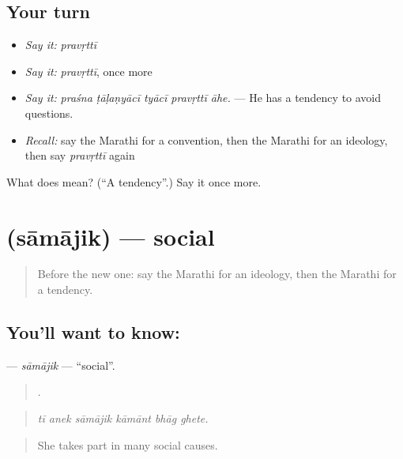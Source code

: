 \subsection*{Your turn}
\begin{itemize}
\raggedright
  \item \emph{Say it:} \emph{pravṛttī}
  \item \emph{Say it:} \emph{pravṛttī}, once more
  \item \emph{Say it:} \emph{praśna ṭāḷaṇyācī tyācī pravṛttī āhe.} — He has a tendency to avoid questions.
  \item \emph{Recall:} say the Marathi for a convention, then the Marathi for an ideology, then say \emph{pravṛttī} again
\end{itemize}

\begin{tcolorbox}[breakable,colback=teal!4,colframe=teal!35!black,title={Before you move on}]
What does  mean? (\textquotedblleft{}A tendency\textquotedblright{}.) Say it once more.
\end{tcolorbox}
\section[\texorpdfstring{\mr{सामाजिक} (sāmājik)}{सामाजिक (sāmājik)}]{ (sāmājik) — social}

\label{lesson:MR-C367-samajik}



\begin{quote}
Before the new one: say the Marathi for an ideology, then the Marathi for a tendency.
\end{quote}

\subsection*{You'll want to know: }
\textbf{} — \emph{sāmājik} — \textquotedblleft{}social\textquotedblright{}.

\begin{quote}
     .
\end{quote}

\begin{quote}
\emph{tī anek sāmājik kāmānt bhāg ghete.}
\end{quote}

\begin{quote}
She takes part in many social causes.
\end{quote}

